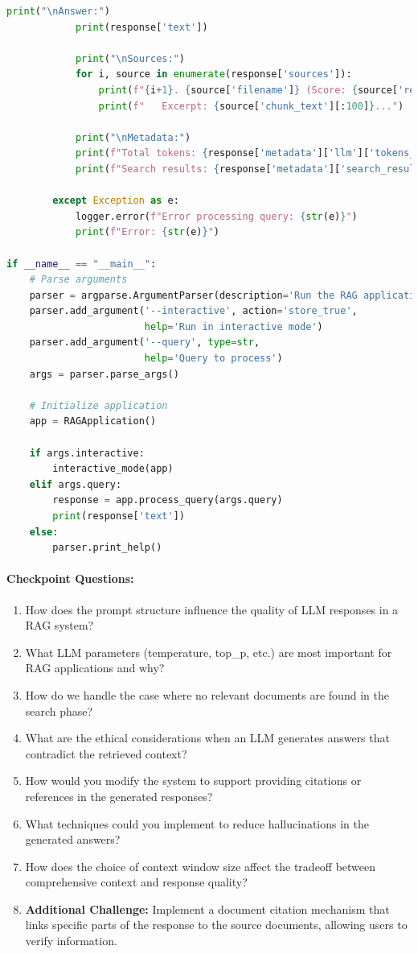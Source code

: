 \documentclass[
  screen,review,acmlarge]{acmart}
\providecommand{\tightlist}{%
  \setlength{\itemsep}{0pt}\setlength{\parskip}{0pt}}
\begin{document}
\begin{lstlisting}[language=Python]
            print("\nAnswer:")
            print(response['text'])
            
            print("\nSources:")
            for i, source in enumerate(response['sources']):
                print(f"{i+1}. {source['filename']} (Score: {source['rerank_score']:.4f})")
                print(f"   Excerpt: {source['chunk_text'][:100]}...")
            
            print("\nMetadata:")
            print(f"Total tokens: {response['metadata']['llm']['tokens_used']}")
            print(f"Search results: {response['metadata']['search_results']}")
            
        except Exception as e:
            logger.error(f"Error processing query: {str(e)}")
            print(f"Error: {str(e)}")

if __name__ == "__main__":
    # Parse arguments
    parser = argparse.ArgumentParser(description='Run the RAG application')
    parser.add_argument('--interactive', action='store_true',
                        help='Run in interactive mode')
    parser.add_argument('--query', type=str,
                        help='Query to process')
    args = parser.parse_args()
    
    # Initialize application
    app = RAGApplication()
    
    if args.interactive:
        interactive_mode(app)
    elif args.query:
        response = app.process_query(args.query)
        print(response['text'])
    else:
        parser.print_help()
\end{lstlisting}

\paragraph{Checkpoint Questions:}\label{checkpoint-questions-5}

\begin{enumerate}
\def\labelenumi{\arabic{enumi}.}
\tightlist
\item
  How does the prompt structure influence the quality of LLM responses in a RAG system?
\item
  What LLM parameters (temperature, top\_p, etc.) are most important for RAG applications and why?
\item
  How do we handle the case where no relevant documents are found in the search phase?
\item
  What are the ethical considerations when an LLM generates answers that contradict the retrieved context?
\item
  How would you modify the system to support providing citations or references in the generated responses?
\item
  What techniques could you implement to reduce hallucinations in the generated answers?
\item
  How does the choice of context window size affect the tradeoff between comprehensive context and response quality?
\item
  \textbf{Additional Challenge:} Implement a document citation mechanism that links specific parts of the response to the source documents, allowing users to verify information.
\end{enumerate}
\end{document}
